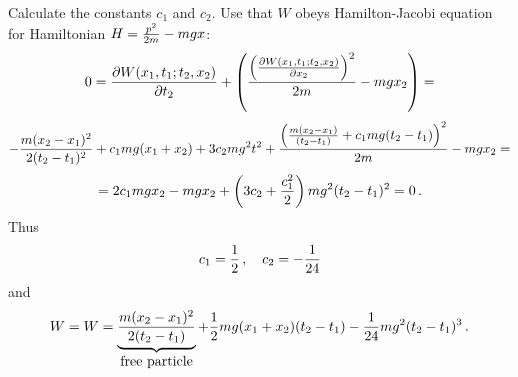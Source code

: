 \medskip

Calculate the constants $c_1$ and $c_2$.
Use that  $W$ obeys
Hamilton-Jacobi equation for Hamiltonian $H={p^2\over
2m}-mgx$:
         $$
        0=
{ \partial W(x_1,t_1;t_2,x_2)\over \partial t_2}+
      \left(
               {
             \left(
{ \partial W(x_1,t_1;t_2,x_2)\over \partial x_2}
    \right)^2
     \over
        2m}-mgx_2
      \right)=
         $$
         $$
-{m(x_2-x_1)^2\over2(t_2-t_1)^2}
   +c_1mg(x_1+x_2)+3c_2mg^2t^2+
        {\left(
     {m(x_2-x_1)\over (t_2-t_1)}+
    c_1mg(t_2-t_1)      
    \right)^2
       \over 2m}
   -mgx_2=
         $$
          $$
  =2c_1mgx_2-mgx_2+\left(3c_2+{c_1^2\over
2}\right)mg^2(t_2-t_1)^2=0\,.
          $$
Thus
        $$
c_1={1\over 2}\,,\quad
      c_2=-{1\over 24}
     $$
  and
       $$
W=W=\underbrace {
{m(x_2-x_1)^2\over2(t_2-t_1)}
     }
_{\hbox{free particle}}+
   {1\over 2}mg(x_1+x_2)(t_2-t_1)-{1\over 24}mg^2(t_2-t_1)^3\,.
      $$
\bye
